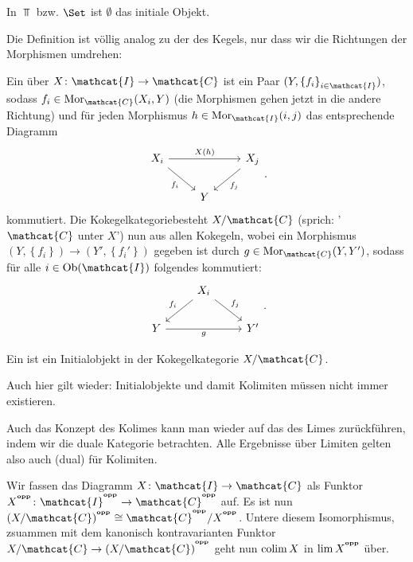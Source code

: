 \begin{example}
    In $\Top$ bzw.  $\Set$ ist  $\emptyset$ das initiale Objekt.
\end{example}

\begin{definition}[Kokegelkategorie]\label{def:kokegelkategorie}
    Die Definition ist völlig analog zu der des Kegels, nur dass wir die Richtungen der Morphismen umdrehen:


    Ein  über $X\colon  \mathcat{I} \to  \mathcat{C}$ ist ein Paar $(Y, \left \{f_i\right\} _{i\in \mathcat{I}})$, sodass $f_i \in  \Mor_{\mathcat{C}}(X_i, Y)$ (die Morphismen gehen jetzt in die andere Richtung) und für jeden Morphismus $h\in \Mor_{\mathcat{I}}(i,j)$ das entsprechende Diagramm
    \[
    \begin{tikzcd}
        X_i \ar{rr}{X(h)} \ar[swap]{dr}{f_i} & & X_j \ar{dl}{f_j} \\
         & Y
    \end{tikzcd}
    .\] 
    kommutiert. Die Kokegelkategoriebesteht $X / \mathcat{C}$ (sprich: '$\mathcat{C}$ unter $X$') nun aus allen Kokegeln, wobei ein Morphismus $(Y, \left \{f_i\right\} ) \to  (Y', \left \{f_i'\right\} )$ gegeben ist durch $g\in \Mor_{\mathcat{C}}(Y,Y')$, sodass für alle $i\in \Ob(\mathcat{I})$ folgendes kommutiert:
    \[
        \begin{tikzcd}
    & X_i \ar[swap]{dl}{f_i} \ar{dr}{f_j} \\
            Y \ar[swap]{rr}{g}& & Y'
        \end{tikzcd}
    .\] 
\end{definition}

\begin{definition}[Kolimes]\label{def:kolimes}
Ein  ist ein Initialobjekt in der Kokegelkategorie $X / \mathcat{C}$. 
\end{definition}

\begin{warning}
    Auch hier gilt wieder: Initialobjekte und damit Kolimiten müssen nicht immer existieren.
\end{warning}

\begin{oral}
    Auch das Konzept des Kolimes kann man wieder auf das des Limes zurückführen, indem wir die duale Kategorie betrachten. Alle Ergebnisse über Limiten gelten also auch (dual) für Kolimiten.
\end{oral}

\begin{lemma**}
    Wir fassen das Diagramm $X\colon  \mathcat{I} \to  \mathcat{C}$ als Funktor $X^{\op}\colon \mathcat{I}^{\op} \to \mathcat{C}^{\op}$ auf. Es ist nun $(X / \mathcat{C})^{\op} \cong \mathcat{C}^{\op} / X^{\op}$. Untere diesem Isomorphismus, zsuammen mit dem kanonisch kontravarianten Funktor $X / \mathcat{C} \to  \left( X / \mathcat{C} \right) ^{\op}$ geht nun $\operatorname{colim} X$ in $\lim X^{\op}$ über.
\end{lemma**}

